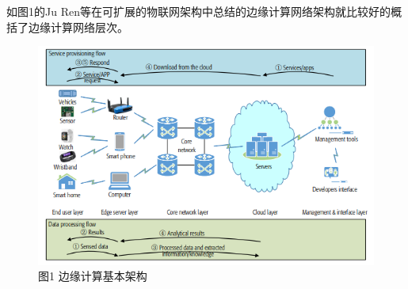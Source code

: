 \documentclass[UTF8,12pt,twoside,a4paper]{ctexart} %
\begin{document}
如图1的Ju Ren等\cite{RN7}在可扩展的物联网架构中总结的边缘计算网络架构就比较好的概括了边缘计算网络层次。
\begin{figure}[htbp]%
	\centering%
	\includegraphics[scale = 1.0]{pic1.png}%
	\caption*{ \songti 图1 边缘计算基本架构\cite{RN7}}
\end{figure}
\vspace{10pt}

\begin{flushleft}
\end{flushleft}%

\songti
\end{document}
